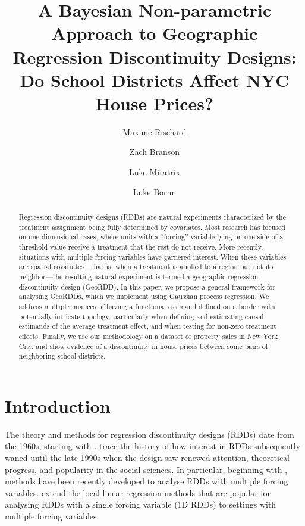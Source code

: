 \documentclass[letter,12pt]{article}
\title{
    A Bayesian Non-parametric Approach to Geographic Regression Discontinuity Designs:
    Do School Districts Affect NYC House Prices?
}
\author[a]{Maxime Rischard}
\author[a]{Zach Branson}
\author[b]{Luke Miratrix}
\author[c]{Luke Bornn}
\affil[a]{Department of Statistics, Harvard University}
\affil[b]{Graduate School of Education, Harvard University}
\affil[c]{Simon Fraser University}
\begin{document}
\maketitle

\begin{abstract}
    Regression discontinuity designs (RDDs) are natural experiments characterized by the treatment assignment being fully determined by covariates.
    Most research has focused on one-dimensional cases, where units with a ``forcing'' variable lying on one side of a threshold value receive a treatment that the rest do not receive.
    More recently, situations with multiple forcing variables have garnered interest.
    When these variables are spatial covariates---that is, when a treatment is applied to a region but not its neighbor---the resulting natural experiment is termed a geographic regression discontinuity design (GeoRDD).
    In this paper, we propose a general framework for analysing GeoRDDs, which we implement using Gaussian process regression.
    We address multiple nuances of having a functional estimand defined on a border with potentially intricate topology, particularly when defining and estimating causal estimands of the average treatment effect, and when testing for non-zero treatment effects.
    Finally, we use our methodology on a dataset of property sales in New York City,
    and show evidence of a discontinuity in house prices between some pairs of neighboring school districts.
\end{abstract}
\hypertarget{introduction}{%
\section{Introduction}\label{introduction}}

The theory and methods for regression discontinuity designs (RDDs) date from the 1960s, starting with \cite{thistlethwaite1960regression}.
\cite{cook2008waiting} trace the history of how interest in RDDs subsequently waned until the late 1990s when the design saw renewed attention, theoretical progress, and popularity in the social sciences.
In particular, beginning with \cite{papay2011extending}, methods have been recently developed to analyse RDDs with multiple forcing variables.
\cite{imbens2011regression} extend the local linear regression methods \citep[see][]{imbensrdd} that are popular for analysing RDDs with a single forcing variable (1D RDDs) to settings with multiple forcing variables.
\end{document}
